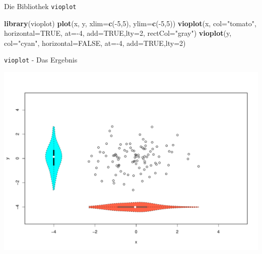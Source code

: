 \documentclass[ignorenonframetext,]{beamer}
\newenvironment{Shaded}{}{}
\newcommand{\KeywordTok}[1]{\textcolor[rgb]{0.00,0.44,0.13}{\textbf{{#1}}}}
\newcommand{\DataTypeTok}[1]{\textcolor[rgb]{0.56,0.13,0.00}{{#1}}}
\newcommand{\DecValTok}[1]{\textcolor[rgb]{0.25,0.63,0.44}{{#1}}}
\newcommand{\StringTok}[1]{\textcolor[rgb]{0.25,0.44,0.63}{{#1}}}
\newcommand{\OtherTok}[1]{\textcolor[rgb]{0.00,0.44,0.13}{{#1}}}
\newcommand{\NormalTok}[1]{{#1}}
\begin{document}
\begin{frame}[fragile]{Die Bibliothek \texttt{vioplot}}

\begin{Shaded}
\begin{Highlighting}[]
\KeywordTok{library}\NormalTok{(vioplot)}
\KeywordTok{plot}\NormalTok{(x, y, }\DataTypeTok{xlim=}\KeywordTok{c}\NormalTok{(-}\DecValTok{5}\NormalTok{,}\DecValTok{5}\NormalTok{), }\DataTypeTok{ylim=}\KeywordTok{c}\NormalTok{(-}\DecValTok{5}\NormalTok{,}\DecValTok{5}\NormalTok{))}
\KeywordTok{vioplot}\NormalTok{(x, }\DataTypeTok{col=}\StringTok{"tomato"}\NormalTok{, }\DataTypeTok{horizontal=}\OtherTok{TRUE}\NormalTok{, }\DataTypeTok{at=}\NormalTok{-}\DecValTok{4}\NormalTok{, }
        \DataTypeTok{add=}\OtherTok{TRUE}\NormalTok{,}\DataTypeTok{lty=}\DecValTok{2}\NormalTok{, }\DataTypeTok{rectCol=}\StringTok{"gray"}\NormalTok{)}
\KeywordTok{vioplot}\NormalTok{(y, }\DataTypeTok{col=}\StringTok{"cyan"}\NormalTok{, }\DataTypeTok{horizontal=}\OtherTok{FALSE}\NormalTok{, }\DataTypeTok{at=}\NormalTok{-}\DecValTok{4}\NormalTok{, }
        \DataTypeTok{add=}\OtherTok{TRUE}\NormalTok{,}\DataTypeTok{lty=}\DecValTok{2}\NormalTok{)}
\end{Highlighting}
\end{Shaded}

\end{frame}

\begin{frame}{\texttt{vioplot} - Das Ergebnis}

\includegraphics{R_intern_files/figure-beamer/unnamed-chunk-218-1.pdf}

\end{frame}
\end{document}
